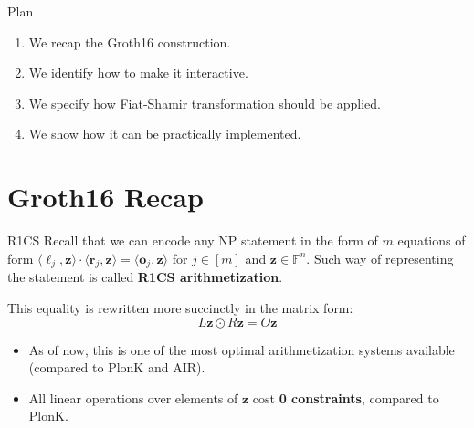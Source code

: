 \documentclass{zkdl-presentation-template}
\begin{document}
    \begin{frame}{Plan}
        \begin{enumerate}
            \item We recap the Groth16 construction.
            \item We identify how to make it interactive.
            \item We specify how Fiat-Shamir transformation should be applied.
            \item We show how it can be practically implemented.
        \end{enumerate}
    \end{frame}

    \section{Groth16 Recap}

    \begin{frame}{R1CS}
        Recall that we can encode any NP statement in the form of $m$ equations
        of form $\langle \boldsymbol{\ell}_j, \mathbf{z} \rangle \cdot \langle
        \boldsymbol{r}_j, \mathbf{z} \rangle = \langle \boldsymbol{o}_j,
        \mathbf{z} \rangle$ for $j \in [m]$ and $\mathbf{z} \in \mathbb{F}^n$.
        Such way of representing the statement is called \textbf{R1CS
        arithmetization}.\pause

        This equality is rewritten more succinctly in the matrix form:
        \begin{equation*}
            L\mathbf{z} \odot R\mathbf{z} = O\mathbf{z}
        \end{equation*}

        \pause\begin{itemize}[label=\textcolor{green!70!black}{}]
            \item As of now, this is one of the most optimal arithmetization
            systems available (compared to PlonK and AIR).
            \item All linear operations over elements of $\mathbf{z}$ cost
            \textbf{0 constraints}, compared to PlonK.
        \end{itemize}
    \end{frame}
\end{document}
